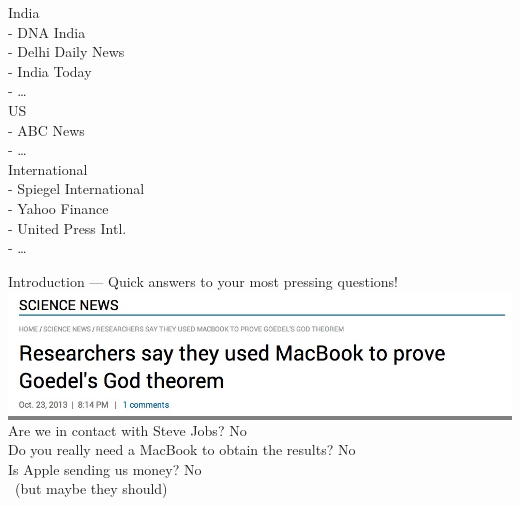 \begin{frame}{}
\begin{minipage}{.3\textwidth}
India \\
- DNA India \\
- Delhi Daily News \\
- India Today \\
- \ldots \\

US \\
- ABC News \\
- \ldots \\

International \\
- Spiegel International \\
- Yahoo Finance \\
- United Press Intl. \\
- \ldots \\
\end{minipage}
\end{frame}

\begin{frame}{Introduction --- Quick answers to your most pressing questions!} \large
\colorbox{gray}{\includegraphics[width=\textwidth]{Images/News/MacBookGrab}} 
\pause
\vfill
Are we in contact with Steve Jobs? \hfill No \\[2em]
Do you really need a MacBook to obtain the results? \hfill No \\[2em]
Is Apple sending us money? \hfill No \\
\, \hfill (but maybe they should)
\end{frame}

